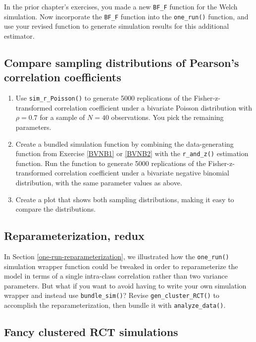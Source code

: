 \documentclass[
]{book}
\begin{document}
In the prior chapter's exercises, you made a new \texttt{BF\_F} function for the Welch simulation. Now incorporate the \texttt{BF\_F} function into the \texttt{one\_run()} function, and use your revised function to generate simulation results for this additional estimator.

\subsection{Compare sampling distributions of Pearson's correlation coefficients}\label{Pearson-sampling-distributions}

\begin{enumerate}
\def\labelenumi{\arabic{enumi}.}
\item
  Use \texttt{sim\_r\_Poisson()} to generate 5000 replications of the Fisher-z-transformed correlation coefficient under a bivariate Poisson distribution with \(\rho = 0.7\) for a sample of \(N = 40\) observations. You pick the remaining parameters.
\item
  Create a bundled simulation function by combining the data-generating function from Exercise \ref{BVNB1} or \ref{BVNB2} with the \texttt{r\_and\_z()} estimation function. Run the function to generate 5000 replications of the Fisher-z-transformed correlation coefficient under a bivariate negative binomial distribution, with the same parameter values as above.
\item
  Create a plot that shows both sampling distributions, making it easy to compare the distributions.
\end{enumerate}

\subsection{Reparameterization, redux}\label{reparameterization-redux}

In Section \ref{one-run-reparameterization}, we illustrated how the \texttt{one\_run()} simulation wrapper function could be tweaked in order to reparameterize the model in terms of a single intra-class correlation rather than two variance parameters.
But what if you want to avoid having to write your own simulation wrapper and instead use \texttt{bundle\_sim()}?
Revise \texttt{gen\_cluster\_RCT()} to accomplish the reparameterization, then bundle it with \texttt{analyze\_data()}.

\subsection{Fancy clustered RCT simulations}\label{fancy-cluster-RCT-sims}
\end{document}
